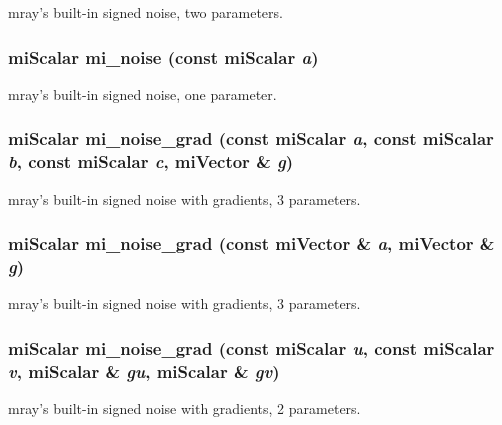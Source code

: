mray's built-in signed noise, two parameters. 

\subsubsection{\setlength{\rightskip}{0pt plus 5cm}mi\-Scalar mi\_\-noise (const mi\-Scalar {\em a})\hspace{0.3cm}{\tt  [inline]}}\label{namespacersl_a44}


mray's built-in signed noise, one parameter. 

\subsubsection{\setlength{\rightskip}{0pt plus 5cm}mi\-Scalar mi\_\-noise\_\-grad (const mi\-Scalar {\em a}, const mi\-Scalar {\em b}, const mi\-Scalar {\em c}, mi\-Vector \& {\em g})\hspace{0.3cm}{\tt  [inline]}}\label{namespacersl_a55}


mray's built-in signed noise with gradients, 3 parameters. 

\subsubsection{\setlength{\rightskip}{0pt plus 5cm}mi\-Scalar mi\_\-noise\_\-grad (const mi\-Vector \& {\em a}, mi\-Vector \& {\em g})\hspace{0.3cm}{\tt  [inline]}}\label{namespacersl_a54}


mray's built-in signed noise with gradients, 3 parameters. 

\subsubsection{\setlength{\rightskip}{0pt plus 5cm}mi\-Scalar mi\_\-noise\_\-grad (const mi\-Scalar {\em u}, const mi\-Scalar {\em v}, mi\-Scalar \& {\em gu}, mi\-Scalar \& {\em gv})\hspace{0.3cm}{\tt  [inline]}}\label{namespacersl_a53}


mray's built-in signed noise with gradients, 2 parameters. 

